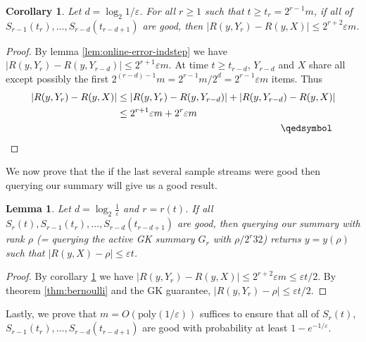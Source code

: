 \documentclass{article}
\theoremstyle{plain}
\newtheorem{lemma}[theorem]{Lemma}
\newtheorem{corollary}[theorem]{Corollary}
\def\ep{\varepsilon}
\newcommand{\p}[1]{(#1)}
\newcommand{\abs}[1]{|#1|}
\newcommand{\OO}[1]{O\p{#1}}
\newcommand{\poly}[1]{\text{poly}\p{#1}}
\newcommand{\rank}[2]{R\p{#1,#2}}
\begin{document}
\begin{corollary}
  \label{cor:online-error-lastgood}
  Let $d = \log_2 1/\ep$. For all $r \ge 1$ such that $t \ge t_r = 2^{r-1} m$,
  if all of $S_{r-1}\p{t_r}, \ldots, S_{r-d}\p{t_{r-d+1}}$ are good, then
  $\abs{\rank{y}{Y_r} - \rank{y}{X}} \le 2^{r+2} \ep m$.
\end{corollary}
\begin{proof}\let\qed\relax
  By lemma \ref{lem:online-error-indstep} we have $\abs{\rank{y}{Y_r} -
    \rank{y}{Y_{r-d}}} \le 2^{r+1} \ep m$. At time $t \ge t_{r-d}$, $Y_{r-d}$
  and $X$ share all except possibly the first $2^{\p{r-d}-1} m = 2^{r-1} m / 2^d
  = 2^{r-1} \ep m$ items. Thus
  \begin{align*}
    \abs{\rank{y}{Y_r} - \rank{y}{X}}
    &\le \abs{\rank{y}{Y_r} - \rank{y}{Y_{r-d}}} + \abs{\rank{y}{Y_{r-d}} - \rank{y}{X}} \\
    &\le 2^{r+1} \ep m + 2^r \ep m
    \\ & \omit\hfill\qedsymbol
  \end{align*}
\end{proof}

We now prove that the if the last several sample streams were good then querying
our summary will give us a good result.

\begin{lemma}
  \label{lem:online-error-querygood}
  Let $d = \log_2 \frac{1}{\ep}$ and $r = r\p{t}$. If all $S_r\p{t},
  S_{r-1}\p{t_r}, \ldots, S_{r-d}\p{t_{r-d+1}}$ are good, then querying our
  summary with rank $\rho$ (= querying the active GK summary $G_r$ with $\rho /
  2^r 32$) returns $y = y\p{\rho}$ such that $\abs{\rank{y}{X} - \rho} \le \ep
  t$.
\end{lemma}
\begin{proof}
  By corollary \ref{cor:online-error-lastgood} we have $\abs{\rank{y}{Y_r} -
    \rank{y}{X}} \le 2^{r+2} \ep m \le \ep t / 2$. By theorem
  \ref{thm:bernoulli} and the GK guarantee, $\abs{\rank{y}{Y_r} - \rho} \le \ep
  t / 2$.
\end{proof}

Lastly, we prove that $m = \OO{\poly{1/\ep}}$ suffices to ensure that all of
$S_r\p{t},$ $S_{r-1}\p{t_r}, \ldots, S_{r-d}\p{t_{r-d+1}}$ are good with
probability at least $1 - e^{-1/\ep}$.
\end{document}
